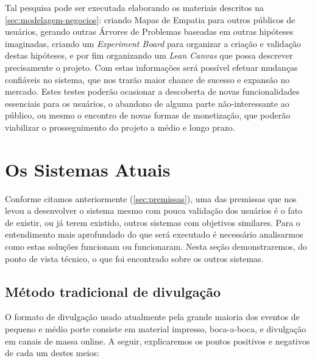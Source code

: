 \documentclass[12pt,a4paper,twoside,hyphens,english,brazil]{abntex2}
\begin{document}
Tal pesquisa pode ser executada elaborando os materiais descritos na \autoref{sec:modelagem-negocios}: criando Mapas de Empatia para outros públicos de usuários, gerando outras Árvores de Problemas baseadas em outras hipóteses imaginadas, criando um \emph{Experiment Board}\footnotemark\cite{experiment-board-post}\cite{experiment-board-javelin} para organizar a criação e validação destas hipóteses, e por fim organizando um \emph{Lean Canvas} que possa descrever precisamente o projeto. Com estas informações será possível efetuar mudanças confiáveis no sistema, que nos trarão maior chance de sucesso e expansão no mercado. Estes testes poderão ocasionar a descoberta de novas funcionalidades essenciais para os usuários, o abandono de alguma parte não-interessante ao público, ou mesmo o encontro de novas formas de monetização, que poderão viabilizar o prosseguimento do projeto a médio e longo prazo.

\chapter{Os Sistemas Atuais}
Conforme citamos anteriormente (\autoref{sec:premissas}), uma das premissas que nos levou a desenvolver o sistema mesmo com pouca validação dos usuários é o fato de existir, ou já terem existido, outros sistemas com objetivos similares.
Para o entendimento mais aprofundado do que será executado é necessário analisarmos como estas soluções funcionam ou funcionaram. Nesta seção demonstraremos, do ponto de vista técnico, o que foi encontrado sobre os outros sistemas.

\section{Método tradicional de divulgação} \label{sec:sistemas:tradicional}
O formato de divulgação usado atualmente pela grande maioria dos eventos de pequeno e médio porte consiste em material impresso, boca-a-boca, e divulgação em canais de massa online. A seguir, explicaremos os pontos positivos e negativos de cada um destes meios:
\end{document}
